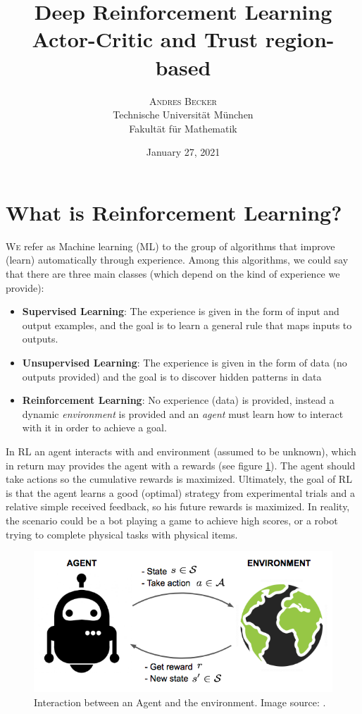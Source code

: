 \documentclass[twoside,twocolumn]{article}
\title{Deep Reinforcement Learning \\ Actor-Critic and Trust region-based} %
\author{%
\textsc{Andres Becker} \\[1ex] %
\normalsize Technische Universität München \\ %
\normalsize Fakultät für Mathematik
}
\date{January 27, 2021}
\begin{document}
\maketitle


\section{What is Reinforcement Learning?}
\lettrine[nindent=0em,lines=3]{W}e refer as Machine learning (ML) to the group of algorithms that improve (learn) automatically through experience. Among this algorithms, we could say that there are three main classes (which depend on the kind of experience we provide):
\begin{itemize}
  \item \textbf{Supervised Learning}: The experience is given in the form of input and output examples, and the goal is to learn a general rule that maps inputs to outputs.
  \item \textbf{Unsupervised Learning}: The experience is given in the form of data (no outputs provided) and the goal is to discover hidden patterns in data
  \item \textbf{Reinforcement Learning}: No experience (data) is provided, instead a dynamic \emph{environment} is provided and an \emph{agent} must learn how to interact with it in order to achieve a goal.
\end{itemize}

\noindent In RL an agent interacts with and environment (assumed to be unknown), which in return may provides the agent with a rewards (see figure \ref{fig:RL_interaction}). The agent should take actions so the cumulative rewards is maximized. Ultimately, the goal of RL is that the agent learns a good (optimal) strategy from experimental trials and a relative simple received feedback, so his future rewards is maximized. In reality, the scenario could be a bot playing a game to achieve high scores, or a robot trying to complete physical tasks with physical items.

\begin{figure}
  \centering
  \includegraphics[scale=.24]{Images/RL_illustration.png}
  \caption{Interaction between an Agent and the environment. Image source: \cite{RLsummarylilian}.}
  \label{fig:RL_interaction}
\end{figure}
\end{document}
